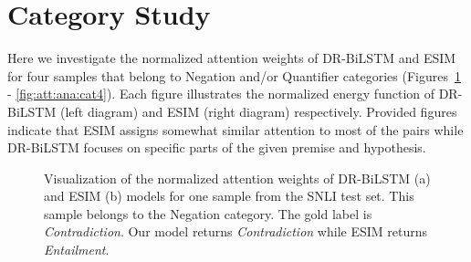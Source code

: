 \documentclass[11pt,a4paper]{article}
\begin{document}
	\section{Category Study}
	\label{app:attcat:sec}
	
	Here we investigate the normalized attention weights of DR-BiLSTM and ESIM for four samples that belong to Negation and/or Quantifier categories (Figures~\ref{fig:att:ana:cat1} - \ref{fig:att:ana:cat4}). Each figure illustrates the normalized energy function of DR-BiLSTM (left diagram) and ESIM (right diagram) respectively. Provided figures indicate that ESIM assigns somewhat similar attention to most of the pairs while DR-BiLSTM focuses on specific parts of the given premise and hypothesis.
	
	\begin{figure}[ht]
		\begin{center}
		\end{center}
		\caption{
			Visualization of the normalized attention weights of DR-BiLSTM (a) and ESIM (b) models for one sample from the SNLI test set. This sample belongs to the Negation category. The gold label is \emph{Contradiction}. Our model returns \emph{Contradiction} while ESIM returns \emph{Entailment}.
		}
		\label{fig:att:ana:cat1}
	\end{figure}
	
\end{document}
